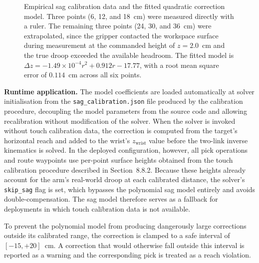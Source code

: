 \begin{figure}[H]
    \caption{Empirical sag calibration data and the fitted 
    quadratic correction model. Three points (6, 12, and 18~cm) 
    were measured directly with a ruler. The remaining three 
    points (24, 30, and 36~cm) were extrapolated, since the 
    gripper contacted the workspace surface during measurement at 
    the commanded height of $z = 2.0$~cm and the true droop 
    exceeded the available headroom. The fitted model is 
    $\Delta z = -1.49 \times 10^{-4} r^2 + 0.912 r - 17.77$, with 
    a root mean square error of $0.114$~cm across all six points.}
\end{figure}

\textbf{Runtime application.} The model coefficients are loaded 
automatically at solver initialisation from the 
\texttt{sag\_calibration.json} file produced by the calibration 
procedure, decoupling the model parameters from the source code 
and allowing recalibration without modification of the solver. 
When the solver is invoked without touch calibration data, the 
correction is computed from the target's horizontal reach and 
added to the wrist's $z_{\mathrm{wrist}}$ value before the 
two-link inverse kinematics is solved. In the deployed 
configuration, however, all pick operations and route waypoints 
use per-point surface heights obtained from the touch 
calibration procedure described in Section~8.8.2. Because these 
heights already account for the arm's real-world droop at each 
calibrated distance, the solver's \texttt{skip\_sag} flag is 
set, which bypasses the polynomial sag model entirely and 
avoids double-compensation. The sag model therefore serves as 
a fallback for deployments in which touch calibration data is 
not available.

To prevent the polynomial model from producing dangerously 
large corrections outside its calibrated range, the correction 
is clamped to a safe interval of $[-15, +20]$~cm. A correction 
that would otherwise fall outside this interval is reported as a 
warning and the corresponding pick is treated as a reach 
violation.

